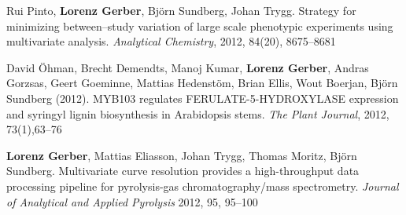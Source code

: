 \documentclass[10pt]{article}
\begin{document}
\begin{bibenum}
                                                                                           \item Rui Pinto, \textbf{Lorenz Gerber}, Bj\"{o}rn Sundberg,
                                                                                             Johan Trygg. Strategy for minimizing between--study variation of large
                                                                                             scale phenotypic experiments using multivariate analysis.
                                                                                             \emph{Analytical Chemistry}, 2012, 84(20), 8675--8681\\


                                                                                           \item David \"{O}hman, Brecht Demendts, Manoj Kumar,
                                                                                             \textbf{Lorenz Gerber}, Andras Gorzsas, Geert Goeminne,
                                                                                             Mattias Hedenst\"{o}m, Brian Ellis, Wout Boerjan, Bj\"{o}rn Sundberg (2012).
                                                                                             MYB103 regulates FERULATE-5-HYDROXYLASE expression and
                                                                                             syringyl lignin biosynthesis in Arabidopsis stems.
                                                                                             \emph{The Plant Journal}, 2012, 73(1),63--76\\


                                                                                           \item \textbf{Lorenz Gerber}, Mattias Eliasson, Johan Trygg,
                                                                                             Thomas Moritz, Bj\"{o}rn Sundberg. Multivariate curve
                                                                                             resolution provides a high-throughput data processing pipeline
                                                                                             for pyrolysis-gas chromatography/mass spectrometry.
                                                                                             \emph{Journal of Analytical and Applied Pyrolysis} 2012, 95, 95--100\\



\end{bibenum}
\end{document}
